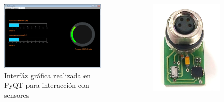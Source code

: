 \documentclass[]{beamer}
\begin{document}
\begin{frame}{}
  \begin{columns}
    \begin{column}{0.7\textwidth}
      \begin{figure}
        \includegraphics[width=\textwidth]{Docs/sensorfinal}
        \caption{Interfáz gráfica realizada en PyQT para interacción con sensores}
        \label{}
      \end{figure}
    \end{column}
    \begin{column}{0.3\textwidth}
      \begin{figure}
        \includegraphics[width=\textwidth]{Docs/Temppress}

\end{figure}
\end{column}
\end{columns}
\end{frame}
\end{document}
